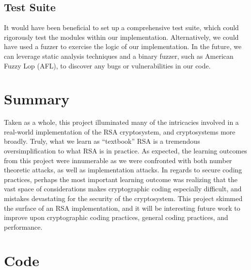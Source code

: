 \documentclass[letterpaper]{article}
\begin{document}
\subsection{Test Suite}

It would have been beneficial to set up a comprehensive test suite, which could rigorously test the modules within our implementation. Alternatively, we could have used a fuzzer to exercise the logic of our implementation. In the future, we can leverage static analysis techniques and a binary fuzzer, such as American Fuzzy Lop (AFL), to discover any bugs or vulnerabilities in our code.

\section{Summary}

Taken as a whole, this project illuminated many of the intricacies involved in a real-world implementation of the RSA cryptosystem, and cryptosystems more broadly. Truly, what we learn as ``textbook'' RSA is a tremendous oversimplification to what RSA is in practice. As expected, the learning outcomes from this project were innumerable as we were confronted with both number theoretic attacks, as well as implementation attacks. In regards to secure coding practices, perhaps the most
important learning outcome was realizing that the vast space of considerations makes cryptographic coding especially difficult, and mistakes devastating for the security of the cryptosystem. This project skimmed the surface of an RSA implementation, and it will be interesting future work to improve upon cryptographic coding practices, general coding practices, and performance.




\appendix

\section{Code}






\end{document}
